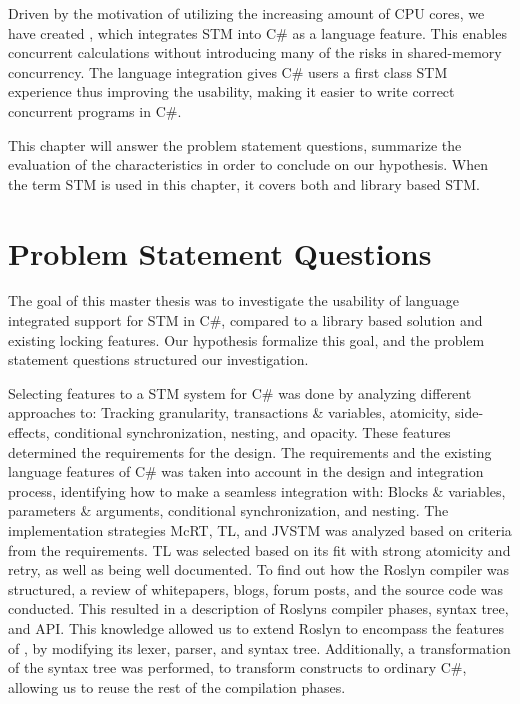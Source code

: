\makeatletter {}\makeatother
{}
Driven by the motivation of utilizing the increasing amount of \ac{CPU} cores, we have created \stmname, which integrates \ac{STM} into C\# as a language feature. This enables concurrent calculations without introducing many of the risks in shared-memory concurrency. The language integration gives C\# users a first class \ac{STM} experience thus improving the usability, making it easier to write correct concurrent programs in C\#.  

This chapter will answer the problem statement questions, summarize the evaluation of the characteristics in order to conclude on our hypothesis. When the term \ac{STM} is used in this chapter, it covers both \stmname and library based \ac{STM}. 

\label{chap:conclusion}

\section{Problem Statement Questions}
The goal of this master thesis was to investigate the usability of language integrated support for \ac{STM} in C\#, compared to a library based solution and existing locking features. Our hypothesis formalize this goal, and the problem statement questions structured our investigation.

Selecting features to a \ac{STM} system for C\# was done by analyzing different approaches to: Tracking granularity, transactions \& variables, atomicity, side-effects, conditional synchronization, nesting, and opacity. These features determined the requirements for the design. The requirements and the existing language features of C\# was taken into account in the design and integration process, identifying how to make a seamless integration with: Blocks \& variables, parameters \& arguments, conditional synchronization, and nesting. The implementation strategies McRT, TL, and JVSTM was analyzed based on criteria from the requirements. TL was selected based on its fit with strong atomicity and retry, as well as being well documented. To find out how the Roslyn compiler was structured, a review of whitepapers, blogs, forum posts, and the source code was conducted. This resulted in a description of Roslyns compiler phases, syntax tree, and \ac{API}. This knowledge allowed us to extend Roslyn to encompass the features of \stmname, by modifying its lexer, parser, and syntax tree. Additionally, a transformation of the syntax tree was performed, to transform \stmname constructs to ordinary C\#, allowing us to reuse the rest of the compilation phases.

